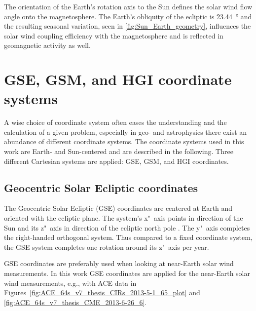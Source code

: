 The orientation of the Earth's rotation axis to the Sun defines the solar wind flow angle onto the magnetosphere. The Earth's obliquity of the ecliptic is \SI{23.44}{\degree} and the resulting seasonal variation, seen in \autoref{fig:Sun_Earth_geometry}, influences the solar wind coupling efficiency with the magnetosphere and is reflected in geomagnetic activity as well.


\section{GSE, GSM, and HGI coordinate systems}
\label{sec:coordinate_systems}

A wise choice of coordinate system often eases the understanding and the calculation of a given problem, especially in geo- and astrophysics there exist an abundance of different coordinate systems. The coordinate systems used in this work are Earth- and Sun-centered and are described in the following. Three different Cartesian systems are applied: GSE, GSM, and HGI coordinates.

\subsection*{Geocentric Solar Ecliptic coordinates}
The Geocentric Solar Ecliptic (GSE) coordinates are centered at Earth and oriented with the ecliptic plane. The system's x"~axis points in direction of the Sun and its z"~axis in direction of the ecliptic north pole \citep{Russell1971,Hapgood1992}. The y"~axis completes the right-handed orthogonal system.
Thus compared to a fixed coordinate system, the GSE system completes one rotation around its z"~axis per year.

GSE coordinates are preferably used when looking at near-Earth solar wind measurements. In this work GSE coordinates are applied for the near-Earth solar wind measurements, e.g., with ACE data in Figures~\ref{fig:ACE_64s_v7_thesis_CIRs_2013-5-1_65_plot} and \ref{fig:ACE_64s_v7_thesis_CME_2013-6-26_6}.

